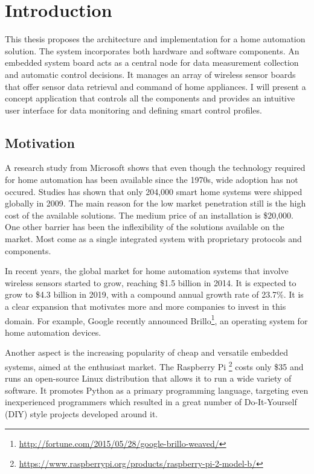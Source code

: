 \chapter{Introduction}

This thesis proposes the architecture and implementation for a home automation solution. The system incorporates both hardware and software components. An embedded system board acts as a central node for data measurement collection and automatic control decisions. It manages an array of wireless sensor boards that offer sensor data retrieval and command of home appliances. I will present a concept application that controls all the components and provides an intuitive user interface for data monitoring and defining smart control profiles.

\section{Motivation}

A research study\cite{microsoft-research} from Microsoft shows that even though the technology required for home automation has been available since the 1970s, wide adoption has not occured. Studies has shown that only 204,000 smart home systems were shipped globally in 2009. The main reason for the low market penetration still is the high cost of the available solutions. The medium price of an installation is \$20,000. One other barrier has been the inflexibility of the solutions available on the market. Most come as a single integrated system with proprietary protocols and components.

In recent years\cite{market-research}, the global market for home automation systems that involve wireless sensors started to grow, reaching \$1.5 billion in 2014. It is expected to grow to \$4.3 billion in 2019, with a compound annual growth rate of 23.7\%. It is a clear expansion that motivates more and more companies to invest in this domain. For example, Google recently announced Brillo\footnote{\url{http://fortune.com/2015/05/28/google-brillo-weaved/}}, an operating system for home automation devices.

Another aspect is the increasing popularity of cheap and versatile embedded systems, aimed at the enthusiast market. The Raspberry Pi \footnote{\url{https://www.raspberrypi.org/products/raspberry-pi-2-model-b/}} costs only \$35 and runs an open-source Linux distribution that allows it to run a wide variety of software. It promotes Python as a primary programming language, targeting even inexperienced programmers which resulted in a great number of Do-It-Yourself (DIY) style projects developed around it.

